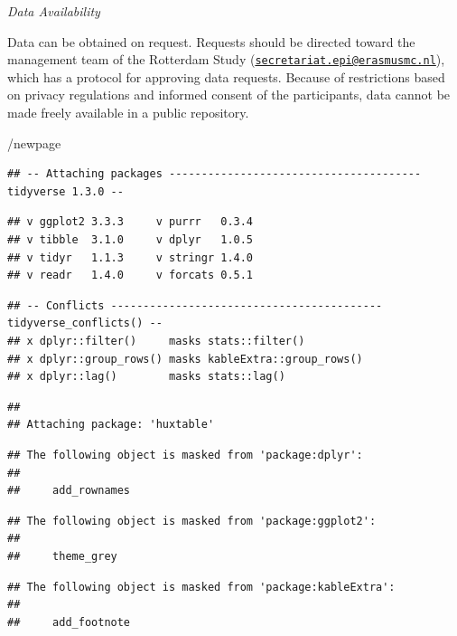 \documentclass[
]{book}
\begin{document}
\emph{Data Availability}

Data can be obtained on request. Requests should be directed toward the management team of the Rotterdam Study (\href{mailto:secretariat.epi@erasmusmc.nl}{\nolinkurl{secretariat.epi@erasmusmc.nl}}), which has a protocol for approving data requests. Because of restrictions based on privacy regulations and informed consent of the participants, data cannot be made freely available in a public repository.

/newpage

\begin{verbatim}
## -- Attaching packages --------------------------------------- tidyverse 1.3.0 --
\end{verbatim}

\begin{verbatim}
## v ggplot2 3.3.3     v purrr   0.3.4
## v tibble  3.1.0     v dplyr   1.0.5
## v tidyr   1.1.3     v stringr 1.4.0
## v readr   1.4.0     v forcats 0.5.1
\end{verbatim}

\begin{verbatim}
## -- Conflicts ------------------------------------------ tidyverse_conflicts() --
## x dplyr::filter()     masks stats::filter()
## x dplyr::group_rows() masks kableExtra::group_rows()
## x dplyr::lag()        masks stats::lag()
\end{verbatim}

\begin{verbatim}
## 
## Attaching package: 'huxtable'
\end{verbatim}

\begin{verbatim}
## The following object is masked from 'package:dplyr':
## 
##     add_rownames
\end{verbatim}

\begin{verbatim}
## The following object is masked from 'package:ggplot2':
## 
##     theme_grey
\end{verbatim}

\begin{verbatim}
## The following object is masked from 'package:kableExtra':
## 
##     add_footnote
\end{verbatim}

\begingroup\fontsize{6.5}{8.5}\selectfont
\end{document}
